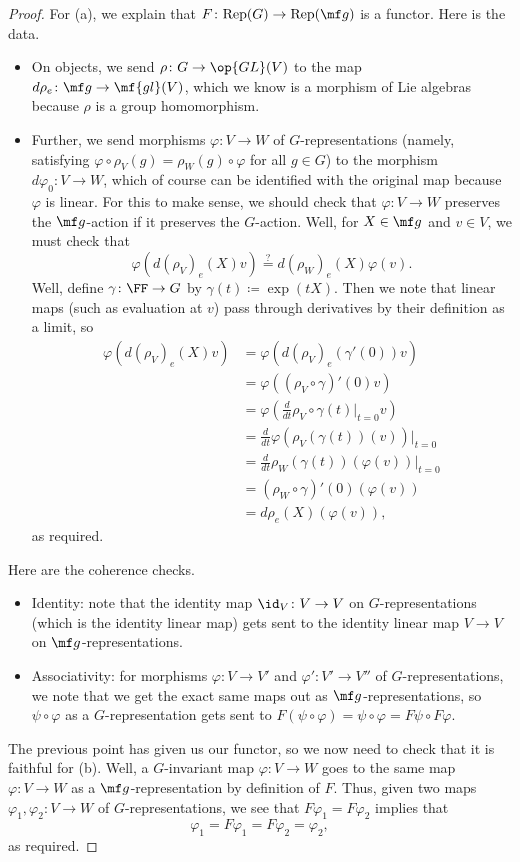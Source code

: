 \documentclass[../notes.tex]{subfiles}
\begin{document}
\begin{proof}
	For (a), we explain that $F\colon\mathrm{Rep}(G)\to\mathrm{Rep}(\mf g)$ is a functor. Here is the data.
	\begin{itemize}
		\item On objects, we send $\rho\colon G\to\op{GL}(V)$ to the map $d\rho_e\colon\mf g\to\mf{gl}(V)$, which we know is a morphism of Lie algebras because $\rho$ is a group homomorphism.

		\item Further, we send morphisms $\varphi\colon V\to W$ of $G$-representations (namely, satisfying $\varphi\circ\rho_V(g)=\rho_W(g)\circ\varphi$ for all $g\in G$) to the morphism $d\varphi_0\colon V\to W$, which of course can be identified with the original map because $\varphi$ is linear. For this to make sense, we should check that $\varphi\colon V\to W$ preserves the $\mf g$-action if it preserves the $G$-action. Well, for $X\in\mf g$ and $v\in V$, we must check that
		\[\varphi(d(\rho_V)_e(X)v)\stackrel?=d(\rho_W)_e(X)\varphi(v).\]
		Well, define $\gamma\colon\FF\to G$ by $\gamma(t)\coloneqq\exp(tX)$. Then we note that linear maps (such as evaluation at $v$) pass through derivatives by their definition as a limit, so
		\begin{align*}
			\varphi(d(\rho_V)_e(X)v) &= \varphi(d(\rho_V)_e(\gamma'(0))v) \\
			&= \varphi\left((\rho_V\circ\gamma)'(0)v\right) \\
			&= \varphi\left(\frac d{dt}\rho_V\circ\gamma(t)\bigg|_{t=0}v\right) \\
			&= \frac d{dt}\varphi(\rho_V(\gamma(t))(v))\bigg|_{t=0} \\
			&= \frac d{dt}\rho_W(\gamma(t))(\varphi(v))\bigg|_{t=0} \\
			&= (\rho_W\circ\gamma)'(0)(\varphi(v)) \\
			&= d\rho_e(X)(\varphi(v)),
		\end{align*}
		as required.
	\end{itemize}
	Here are the coherence checks.
	\begin{itemize}
		\item Identity: note that the identity map $\id_V\colon V\to V$ on $G$-representations (which is the identity linear map) gets sent to the identity linear map $V\to V$ on $\mf g$-representations.
		\item Associativity: for morphisms $\varphi\colon V\to V'$ and $\varphi'\colon V'\to V''$ of $G$-representations, we note that we get the exact same maps out as $\mf g$-representations, so $\psi\circ\varphi$ as a $G$-representation gets sent to $F(\psi\circ\varphi)=\psi\circ\varphi=F\psi\circ F\varphi$.
	\end{itemize}
	The previous point has given us our functor, so we now need to check that it is faithful for (b). Well, a $G$-invariant map $\varphi\colon V\to W$ goes to the same map $\varphi\colon V\to W$ as a $\mf g$-representation by definition of $F$. Thus, given two maps $\varphi_1,\varphi_2\colon V\to W$ of $G$-representations, we see that $F\varphi_1=F\varphi_2$ implies that
	\[\varphi_1=F\varphi_1=F\varphi_2=\varphi_2,\]
	as required.
\end{proof}
\end{document}
